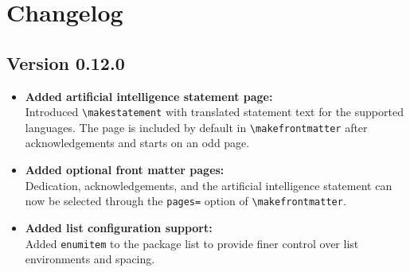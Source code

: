 \section{Changelog}
\subsection{Version 0.12.0}
\begin{itemize}
\item \textbf{Added artificial intelligence statement page:}\\
Introduced \verb|\makestatement| with translated statement text for the supported languages. The page is included by default in \verb|\makefrontmatter| after acknowledgements and starts on an odd page.

\item \textbf{Added optional front matter pages:}\\
Dedication, acknowledgements, and the artificial intelligence statement can now be selected through the \texttt{pages=} option of \verb|\makefrontmatter|.

\item \textbf{Added list configuration support:}\\
Added \texttt{enumitem} to the package list to provide finer control over list environments and spacing.
\end{itemize}

